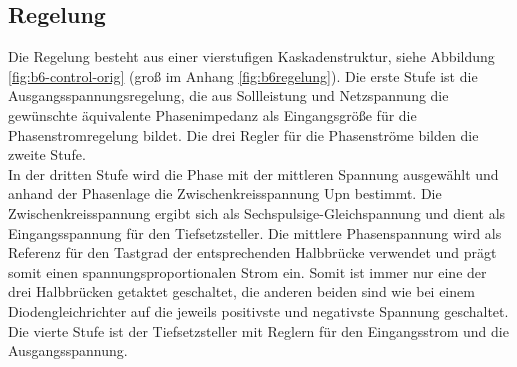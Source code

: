 		\subsection{Regelung}
			Die Regelung besteht aus einer vierstufigen Kaskadenstruktur, siehe Abbildung \ref{fig:b6-control-orig} (groß im Anhang \ref{fig:b6regelung}). Die erste Stufe ist die Ausgangsspannungsregelung, die aus Sollleistung und Netzspannung die gewünschte äquivalente Phasenimpedanz als Eingangsgröße für die Phasenstromregelung bildet. Die drei Regler für die Phasenströme bilden die zweite Stufe.\\
			In der dritten Stufe wird die Phase mit der mittleren Spannung ausgewählt und anhand der Phasenlage die Zwischenkreisspannung \gls{Upn} bestimmt. Die Zwischenkreisspannung ergibt sich als Sechspulsige-Gleichspannung und dient als Eingangsspannung für den Tiefsetzsteller. Die mittlere Phasenspannung wird als Referenz für den Tastgrad der entsprechenden Halbbrücke verwendet und prägt somit einen spannungsproportionalen Strom ein. Somit ist immer nur eine der drei Halbbrücken getaktet geschaltet, die anderen beiden sind wie bei einem Diodengleichrichter auf die jeweils positivste und negativste Spannung geschaltet. Die vierte Stufe ist der Tiefsetzsteller mit Reglern für den Eingangsstrom und die Ausgangsspannung.
				
